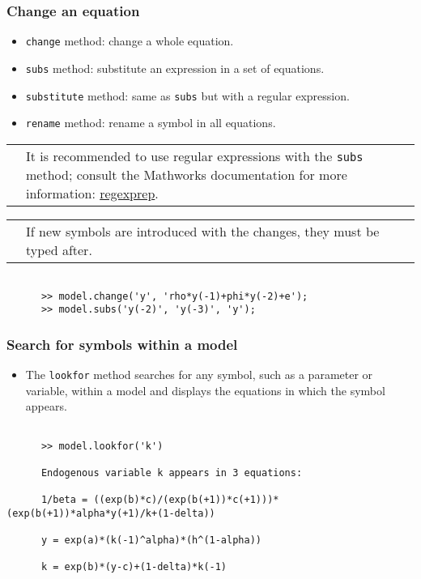 \documentclass[10pt,slidestop]{beamer}
\makeatletter
\theoremstyle{plain}
\newcommand{\dnote}[1]{%
    \noindent %
    \begin{tabular}{@{}m{0.13\textwidth}@{}m{0.87\textwidth}@{}}%
        \huge\textdbend &#1%
    \end{tabular}%
    \par %
}
\makeatother
\begin{document}
\begin{frame}[c,fragile]
  \frametitle{Change an equation}

  \begin{itemize}
  \item \verb+change+ method: change a whole equation.
  \item \verb+subs+ method: substitute an expression in a set of equations.
  \item \verb+substitute+ method: same as \verb+subs+ but with a regular expression.
  \item \verb+rename+ method: rename a symbol in all equations.
  \end{itemize}

    \medskip

    \dnote{It is recommended to use regular expressions with the \texttt{subs} method; consult the Mathworks documentation for more information: \href{https://fr.mathworks.com/help/matlab/ref/regexprep.html}{regexprep}.}

    \bigskip

    \dnote{If new symbols are introduced with the changes, they must be typed after.}

    \bigskip

    \begin{lstlisting}[style=MatlabConsole]

      >> model.change('y', 'rho*y(-1)+phi*y(-2)+e');
      >> model.subs('y(-2)', 'y(-3)', 'y');
  \end{lstlisting}

\end{frame}


\begin{frame}[c,fragile]
  \frametitle{Search for symbols within a model}

  \begin{itemize}

  \item The \verb+lookfor+ method searches for any symbol, such as a parameter or variable, within a model and displays the equations in which the symbol appears.\newline

  \end{itemize}

    \medskip

    \begin{lstlisting}[style=MatlabConsole]

      >> model.lookfor('k')

      Endogenous variable k appears in 3 equations:

      1/beta = ((exp(b)*c)/(exp(b(+1))*c(+1)))*(exp(b(+1))*alpha*y(+1)/k+(1-delta))

      y = exp(a)*(k(-1)^alpha)*(h^(1-alpha))

      k = exp(b)*(y-c)+(1-delta)*k(-1)
  \end{lstlisting}

\end{frame}
\end{document}
